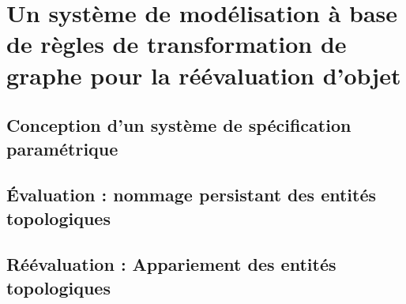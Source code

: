 
\chapter[Un système de modélisation à base de règles de transformation de graphe pour la réévaluation d'objet]{Un système de modélisation à base de règles de transformation de graphe pour la réévaluation d'objet}
\label{cha:system-base-regle-reevaluation-objet}

\section[Conception d'un système de spécification paramétrique]{Conception d'un système de spécification paramétrique}
\label{sec:conception-systeme-parametrique}

\section[Évaluation : nommage persistant des entités topologiques]{Évaluation : nommage persistant des entités topologiques}
\label{sec:evaluation-nommage-entites-topologiques}

\section[Réévaluation : Appariement des entités topologiques]{Réévaluation : Appariement des entités topologiques}
\label{sec:reevaluation-appariement-entites-topologiques}

